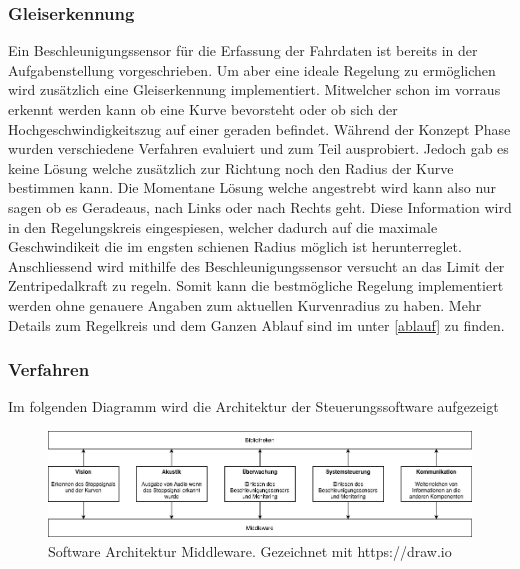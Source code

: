 \documentclass[../../main.tex]{subfiles}
\begin{document}
\subsubsection{Gleiserkennung}
Ein Beschleunigungssensor für die Erfassung der Fahrdaten ist bereits in der Aufgabenstellung vorgeschrieben.
Um aber eine ideale Regelung zu ermöglichen wird zusätzlich eine Gleiserkennung implementiert. Mitwelcher schon im vorraus
erkennt werden kann ob eine Kurve bevorsteht oder ob sich der Hochgeschwindigkeitszug auf einer geraden befindet.
Während der Konzept Phase wurden verschiedene Verfahren evaluiert und zum Teil ausprobiert. Jedoch gab es keine Lösung welche zusätzlich zur Richtung noch den Radius
der Kurve bestimmen kann. Die Momentane Lösung welche angestrebt wird kann also nur sagen ob es Geradeaus, nach Links oder nach Rechts geht.
Diese Information wird in den Regelungskreis eingespiesen, welcher dadurch auf die maximale Geschwindikeit die im engsten schienen Radius möglich ist
herunterreglet. Anschliessend wird mithilfe des Beschleunigungssensor versucht an das Limit der Zentripedalkraft zu regeln. Somit kann die
bestmögliche Regelung implementiert werden ohne genauere Angaben zum aktuellen Kurvenradius zu haben.
Mehr Details zum Regelkreis und dem Ganzen Ablauf sind im unter \ref{ablauf} zu finden.

\subsubsection{Verfahren}
Im folgenden Diagramm wird die Architektur der Steuerungssoftware aufgezeigt
\begin{figure}[H] %
    \centering
    \includegraphics[width=1.0\textwidth]{../../drawings/ArchitekturDiagramm/SW_Architektur_Middleware.png}
    \caption {Software Architektur Middleware. Gezeichnet mit https://draw.io}
\end{figure}
\end{document}
